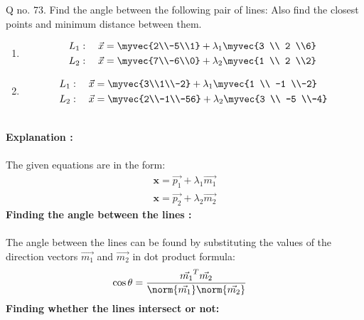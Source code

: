 \documentclass[journal,12pt,twocolumn]{IEEEtran}
\begin{document}
\noindent Q no. 73. Find the angle between the following pair of lines: Also find the closest points and minimum distance between them.
\begin{enumerate}
\item
\begin{align}
L_1: \quad \vec{x} &= \myvec{2\\-5\\1} + \lambda_1\myvec{3 \\ 2 \\6}
\\
L_2: \quad \vec{x} &= \myvec{7\\-6\\0} + \lambda_2\myvec{1 \\ 2 \\2}
\end{align}
\item
\begin{align}
L_1: \quad \vec{x} &= \myvec{3\\1\\-2} + \lambda_1\myvec{1 \\ -1 \\-2}
\\
L_2: \quad \vec{x} &= \myvec{2\\-1\\-56} + \lambda_2\myvec{3 \\ -5 \\-4}
\end{align}
\end{enumerate}
%
\\
\textbf{Explanation :}\\
\\
\noindent
The given equations are in the form:
\begin{align}
    \textbf{x}=\vec{p_1} + \lambda_1\vec{m_1}\\
    \textbf{x}=\vec{p_2} + \lambda_2\vec{m_2}
\end{align}
\textbf{Finding the angle between the lines :} \\ \\ 
The angle between the lines can be found by substituting the values of the direction vectors $\vec{m_1}$ and $\vec{m_2}$ in dot product formula:
\begin{align}
    \cos \theta &= \frac{\vec{m_1}^T\vec{m_2}}{\norm{\vec{m_1}}\norm{\vec{m_2}}}
\end{align}
\textbf{Finding whether the lines intersect or not:}\\ \\
\end{document}
